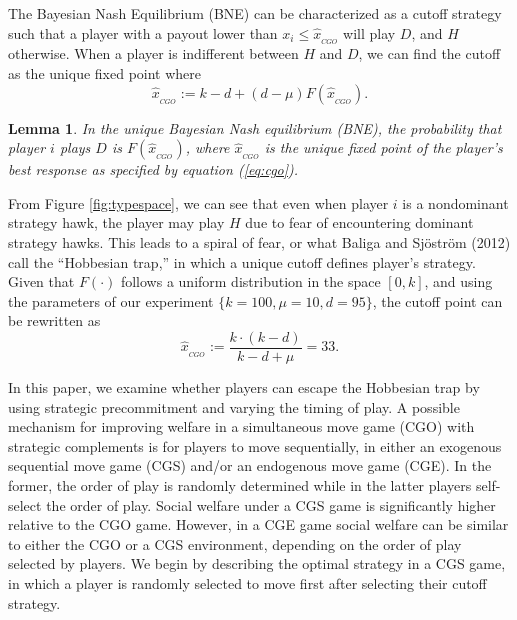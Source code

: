 \documentclass[12pt, letterpaper]{article}
\theoremstyle{plain}
\begin{document}
The Bayesian Nash Equilibrium (BNE) can be characterized as a cutoff strategy such that a player with a payout lower than $x_i\leq\hat{x}_{_{CGO}}$ will play $D$, and $H$ otherwise.  When a player is indifferent between $H$ and $D$, we can find the cutoff as the unique fixed point where 
\begin{equation}
\hat{x}_{_{CGO}}:= k-d + (d-\mu) F(\hat{x}_{_{CGO}}). \label{eq:cgo}
\end{equation}

\newtheorem{lem}{Lemma}
\begin{lem}
In the unique Bayesian Nash equilibrium (BNE), the probability that player $i$ plays $D$ is $F(\hat{x}_{_{CGO}})$, where $\hat{x}_{_{CGO}}$ is the unique fixed point of the player's best response as specified by equation (\ref{eq:cgo}).
\end{lem}\par

From Figure \ref{fig:typespace}, we can see that even when player $i$ is a nondominant strategy hawk, the player may play $H$ due to fear of encountering dominant strategy hawks. This leads to a spiral of fear, or what Baliga and Sj\"ostr\"om (2012) call the ``Hobbesian trap,''  in which a unique cutoff defines player's strategy. Given that $F(\cdot)$ follows a uniform distribution in the space $[0,k]$, and using the parameters of our experiment $\{k=100, \mu=10, d=95 \}$, the cutoff point can be rewritten as 
\begin{equation}
\hat{x}_{_{CGO}}:= \frac{k\cdot (k-d)}{k-d+\mu}=33. \label{eq:cgosol}
\end{equation}


In this paper, we examine whether players can escape the Hobbesian trap by using strategic precommitment and varying the timing of play. A possible mechanism for improving welfare in a simultaneous move game (CGO) with strategic complements is for players to move sequentially, in either an exogenous sequential move game (CGS) and/or an endogenous move game (CGE). In the former, the order of play is randomly determined while in the latter players self-select the order of play. Social welfare under a CGS game is significantly higher relative to the CGO game. However, in a CGE game social welfare can be similar to either the CGO or a CGS environment, depending on the order of play selected by players. We begin by describing the optimal strategy in a CGS game, in which a player is randomly selected to move first after selecting their cutoff strategy. 
\end{document}
